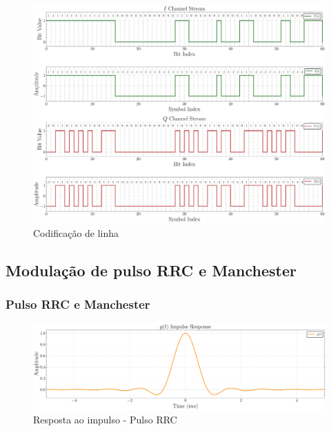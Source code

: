 \begin{figure}[H]
	\centering
	\caption{Codificação de linha}\label{fig:encoder_time}
	\includegraphics[width=\linewidth]{assets/cap3/transmitter_encoder_time.pdf}
\end{figure}

\subsection{Modulação de pulso RRC e Manchester}



\subsubsection{Pulso RRC e Manchester}

\begin{figure}[H]
	\centering
	\caption{Resposta ao impulso - Pulso RRC}\label{fig:impulse_response_rrc}
	\includegraphics[width=\linewidth]{assets/cap3/example_formatter_impulse.pdf}
\end{figure}

